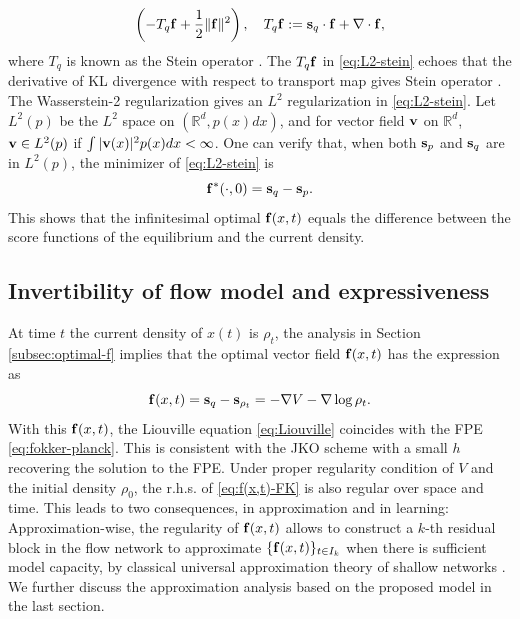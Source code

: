 \documentclass{article}
\theoremstyle{remark}
\theoremstyle{plain}
\newcommand{\R}{\mathbb{R}}
\begin{document}
{\begin{equation}
\left( -  T_q {\bf f}+ \frac{1}{2} \|{\bf f}  \|^2 \right),
\quad T_q {\bf f}:= {\bf s}_q \cdot {\bf f} + \nabla \cdot {\bf f },
\end{equation}
where $ T_q$ is known as the Stein operator \citep{stein1972bound}. 
{
The $T_q {\bf f}$ in \eqref{eq:L2-stein} echoes that the derivative of KL divergence with respect to transport map gives Stein operator \citep{liu2016stein}. The Wasserstein-2 regularization gives an $L^2$ regularization in \eqref{eq:L2-stein}.}
Let $L^2(p)$ be the  $L^2$ space on $(\R^d, p(x) dx)$,
and for vector field ${\bf v}$ on $\R^d$, ${\bf v} \in L^2(p)$ if $\int |{\bf v}(x)|^2 p(x) dx <\infty$.
One can verify that, when both ${\bf s}_p$ and ${\bf s}_q$ are in $L^2(p)$, the minimizer of \eqref{eq:L2-stein} is 
\[
{\bf f}^*(\cdot, 0) = {\bf s}_q - {\bf s}_{p}.
\]
This shows that the infinitesimal optimal ${\bf f}(x,t)$ equals the difference between the score functions of the equilibrium and the current density. 

\subsection{Invertibility of flow model and expressiveness}\label{subsec:invertible-express}

At time $t$ the current density of $x(t)$ is $\rho_t$, 
the analysis in Section \ref{subsec:optimal-f} implies that 
the optimal vector field ${\bf f}(x,t)$ has the expression as 
\begin{equation}\label{eq:f(x,t)-FK}
{\bf f}(x,t) 
= {\bf s}_q - {\bf s}_{\rho_t} 
= - \nabla V - \nabla \log \rho_t.
\end{equation}
With this ${\bf f}(x,t)$, the Liouville equation  \eqref{eq:Liouville} coincides with the FPE \eqref{eq:fokker-planck}.
%
This is consistent with the JKO scheme with a small $h$ recovering the solution to the FPE.
Under proper regularity condition of {$V$ and} the initial density $\rho_0$, the {r.h.s. of} \eqref{eq:f(x,t)-FK} is also regular over space and time. 
This leads to two consequences, in approximation and in learning:
Approximation-wise, the regularity of  ${\bf f}(x,t)$ allows to construct a $k$-th residual block in the flow network to approximate $\{ {\bf f}(x,t) \}_{t \in I_k}$ when there is sufficient model capacity, by classical universal approximation theory of shallow networks \citep{barron1993universal,yarotsky2017error}. 
%
We further discuss the approximation analysis based on the proposed model in the last section.

}
\end{document}
